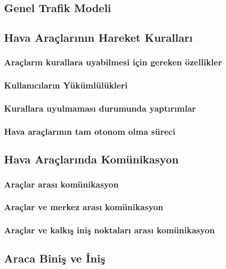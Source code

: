 \subsection{Genel Trafik Modeli}

\subsection{Hava Araçlarının Hareket Kuralları}

\subsubsection{Araçların kurallara uyabilmesi için gereken özellikler}
\subsubsection{Kullanıcıların Yükümlülükleri}
\subsubsection{Kurallara uyulmaması durumunda yaptırımlar}
\subsubsection{Hava araçlarının tam otonom olma süreci}

\subsection{Hava Araçlarında Komünikasyon}

\subsubsection{Araçlar arası komünikasyon}
\subsubsection{Araçlar ve merkez arası komünikasyon}
\subsubsection{Araçlar ve kalkış iniş noktaları arası komünikasyon}

\subsection{Araca Biniş ve İniş}

